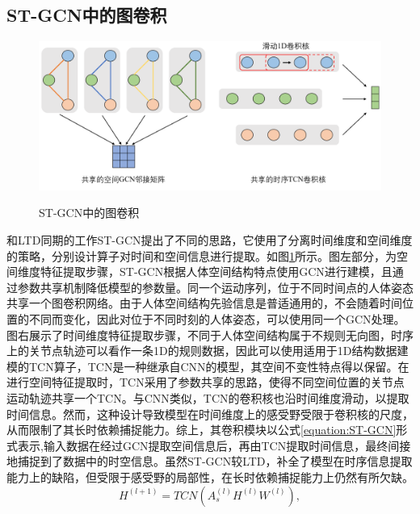 \subsection{ST-GCN中的图卷积}
\begin{figure}[ht]
    \centering
    \includegraphics[width=1\textwidth]{FigMa/ST-GCN.png}\\
    \vspace{-0.3cm}
    \caption{ST-GCN中的图卷积}
    \label{fig:ST-GCN_structure}
\end{figure}
和LTD同期的工作ST-GCN\parencite{yan2018spatial}提出了不同的思路，它使用了分离时间维度和空间维度的策略，分别设计算子对时间和空间信息进行提取。如图\ref{fig:ST-GCN_structure}所示。图左部分，为空间维度特征提取步骤，ST-GCN根据人体空间结构特点使用GCN进行建模，且通过参数共享机制降低模型的参数量。同一个运动序列，位于不同时间点的人体姿态共享一个图卷积网络。由于人体空间结构先验信息是普适通用的，不会随着时间位置的不同而变化，因此对位于不同时刻的人体姿态，可以使用同一个GCN处理。图右展示了时间维度特征提取步骤，不同于人体空间结构属于不规则无向图，时序上的关节点轨迹可以看作一条1D的规则数据，因此可以使用适用于1D结构数据建模的TCN\parencite{oord2016wavenet}算子，TCN是一种继承自CNN的模型，其空间不变性特点得以保留。在进行空间特征提取时，TCN采用了参数共享的思路，使得不同空间位置的关节点运动轨迹共享一个TCN。与CNN类似，TCN的卷积核也沿时间维度滑动，以提取时间信息。然而，这种设计导致模型在时间维度上的感受野受限于卷积核的尺度，从而限制了其长时依赖捕捉能力。综上，其卷积模块以公式\ref{equation:ST-GCN}形式表示,输入数据在经过GCN提取空间信息后，再由TCN提取时间信息，最终间接地捕捉到了数据中的时空信息。虽然ST-GCN较LTD，补全了模型在时序信息提取能力上的缺陷，但受限于感受野的局部性，在长时依赖捕捉能力上仍然有所欠缺。
\begin{equation}
    {H}^{(l+1)}= TCN({A}_{s}^{(l)}{H}^{(l)}{W}^{(l)}),
    \label{equation:ST-GCN}
\end{equation}

